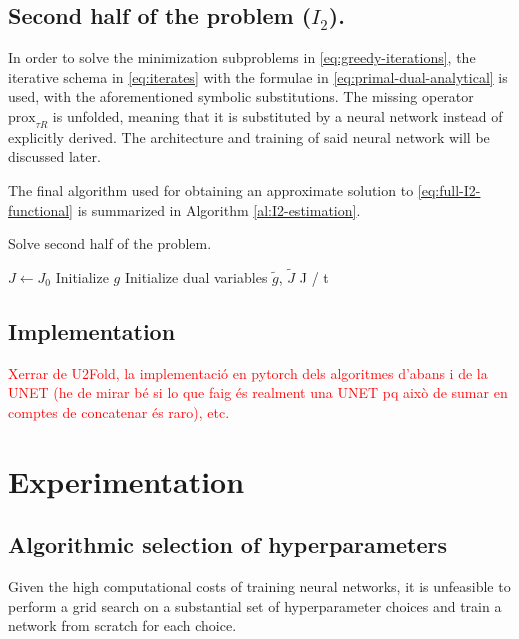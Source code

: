 \documentclass[twocolumn,twoside,a4paper,10pt]{IEEEtran}
\newcommand{\Frank}[1]{\textcolor{red}{#1}}
\begin{document}
\subsection{Second half of the problem (\(I_2\)).}
In order to solve the minimization subproblems in \cref{eq:greedy-iterations}, the iterative schema in \cref{eq:iterates} with the formulae in \cref{eq:primal-dual-analytical} is used, with the aforementioned symbolic substitutions. The missing operator \(\text{prox}_{\tau R}\) is unfolded, meaning that it is substituted by a neural network instead of explicitly derived. The architecture and training of said neural network will be discussed later.

The final algorithm used for obtaining an approximate solution to \cref{eq:full-I2-functional} is summarized in Algorithm \ref{al:I2-estimation}.

\begin{algorithm}\caption{Solve second half of the problem.}
\label{al:I2-estimation}
\KwData{\sigma, \tau}
\(J\gets J_0\)\;
Initialize \(g\)\; 
Initialize dual variables \(\tilde{g}\), \(\tilde{J}\)\;
\Return J / t
\end{algorithm}

\subsection{Implementation}
\Frank{Xerrar de U2Fold, la implementació en pytorch dels algoritmes d'abans i de la UNET (he de mirar bé si lo que faig és realment una UNET pq això de sumar en comptes de concatenar és raro), etc.}
\section{Experimentation}
\subsection{Algorithmic selection of hyperparameters}
Given the high computational costs of training neural networks, it is unfeasible to perform a grid search on a substantial set of hyperparameter choices and train a network from scratch for each choice.
\end{document}
